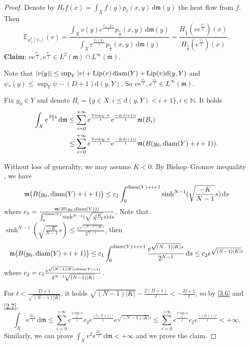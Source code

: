 \documentclass[a4paper,11pt]{article}
\numberwithin{equation}{section}
\theoremstyle{plain}
\theoremstyle{definition}
\theoremstyle{remark}
\newcommand{\mm}{\mathfrak m}
\newcommand{\E}{\mathbb{E}}
\newcommand{\N}{\mathbb{N}}
\newcommand{\diam}{\mathop{\rm diam}\nolimits}
\newcommand{\Lip}{\mathop{\rm Lip}\nolimits}
\renewcommand{\d}{{\mathrm d}}
\begin{document}
	\begin{proof}
		Denote by $H_t f(x)=\int_X f(y) p_t(x, y)\,\d \mm(y)$ the heat flow from $f$. Then
		$$\E_{\mu_x^t[\psi_*]}(v)=\frac{\int_{X} v(y)e^{\frac{\psi_*(y)}{t}} p_\frac{t}{2}(x,y)\,\d\mm(y)}{\int_{X} e^{\frac{\psi_*(y)}{t}} p_\frac{t}{2}(x,y)\,\d\mm(y)}=\frac{H_\frac{t}{2}(v e^\frac{\psi_*}{t})(x)}{H_\frac{t}{2}(e^\frac{\psi_*}{t})(x)}.$$
		{\bf Claim}: $v e^\frac{\psi_*}{t}, e^\frac{\psi_*}{t}\in L^2(\mm)\cap L^\infty(\mm)$.
		
		Note that  $|v(y)| \leq \sup_{Y}|v|+ \Lip(v)\diam(Y)+\Lip(v) \d(y, Y)$ and $\psi_*(y)\leq \sup_Y \psi-(D+1)\d(y, Y)$.  So  $v e^\frac{\psi_*}{t}, e^\frac{\psi_*}{t}\in  L^\infty(\mm)$.
		
		 Fix $y_0\in Y$ and denote $B_i=\{y\in X: i\leq\d(y,Y)<i+1\}, i\in \N$.   It holds
		\begin{equation}\label{3.6}
			\begin{aligned}
			\int_X e^\frac{2\psi_*}{t}\d\mm
			&\leq \sum_{i=0}^{+\infty} e^{\frac{2 \sup_Y \psi}{t}}e^\frac{-2(D+1)i}{t}\mm(B_i)\\
			&\leq  \sum_{i=0}^{+\infty} e^{\frac{2 \sup_Y \psi}{t}}e^\frac{-2(D+1)i}{t}\mm(B(y_0, \diam(Y)+i+1)).		
			\end{aligned}
		\end{equation}
	
		
		
		Without loss of generality,   we may assume $K<0$.  By Bishop--Gromov inequality \cite[Theorem 2.3]{zbMATH05049052}, we have
		\begin{equation*}
		\mm\big(B(y_0, \diam(Y)+i+1)\big)\leq c_1\int_0^{\diam(Y)+i+1}\sinh^{N-1}(\sqrt{\frac{-K}{N-1}}s)\,\d s
		\end{equation*}
		where $c_1=\frac{\mm(B(y_0, \diam(Y)))}{\int_0^{\diam(Y)}\sinh^{N-1}(\sqrt{\frac{-K}{N-1}}s)\d s}$.
		Note that $\sinh^{N-1}(\sqrt{\frac{-K}{N-1}}s)\leq \frac{e^{\sqrt{(N-1)|K|}s}}{2^{N-1}}$, then 
		\begin{equation}\label{2.7}
		\mm\big(B(y_0, \diam(Y)+i+1)\big)\leq c_1 \int_0^{\diam(Y)+i+1}\frac{e^{\sqrt{(N-1)|K|}s}}{2^{N-1}}\,\d s\leq c_2 e^{\sqrt{(N-1)|K|}i}
		\end{equation}
		where $c_2=c_1 \frac{e^{\sqrt{(N-1)|K|}(\diam(Y)+1)}}{2^{N-1}\sqrt{{(N-1)}|K|}}$. 

		For $t<\frac{D+1}{\sqrt{(N-1)|K|}}$,  it holds $\sqrt{(N-1)|K|}-\frac{2(D+1)}{t}<-\frac{D+1}{t}$,  so by \eqref{3.6} and \eqref{2.7},
		\begin{equation}
			\int_X e^\frac{2\psi_*}{t}\,\d\mm\leq \sum_{i=0}^{+\infty} e^{\frac{2 \sup_Y \psi}{t}}c_2 e^\frac{-2(D+1)i}{t}e^{\sqrt{(N-1)|K|}i}\leq  \sum_{i=0}^{+\infty} e^{\frac{2 \sup_Y \psi}{t}}c_2 e^\frac{-(D+1)i}{t}<+\infty.
		\end{equation}
		Similarly, we can prove
			$\int_X v^2 e^\frac{2\psi_*}{t}\,\d\mm<+\infty$ and we prove the claim.
		\medskip
		

\end{proof}
\end{document}
